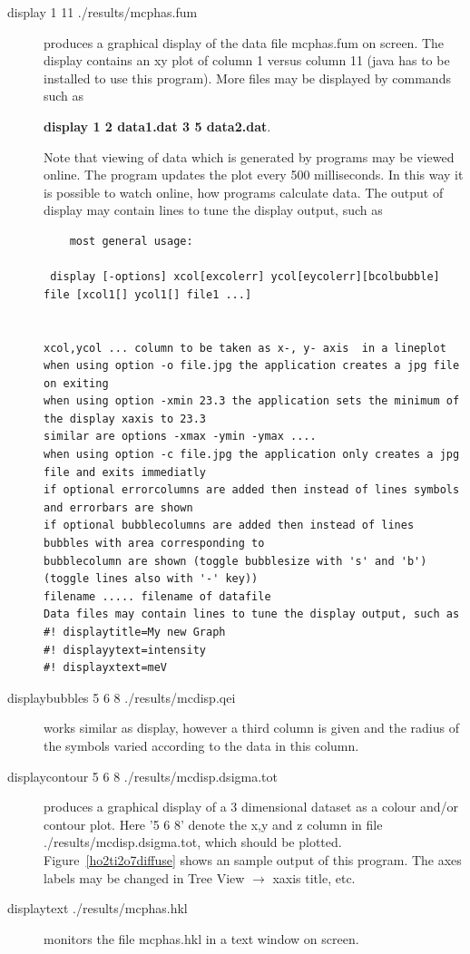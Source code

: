 \begin{description} 
\item [display 1 11 ./results/mcphas.fum] produces a graphical display of the data %
file
mcphas.fum on screen. The display contains an xy plot of column 1 versus column 11
({\prg java} has to be installed to use this program). 
More files may be displayed by commands such as

{\bf display 1 2 data1.dat 3 5 data2.dat}.

Note that viewing of 
data which is generated by programs may be viewed online. The program updates the plot
every 500 milliseconds. In this way it is possible to watch online, how programs
calculate data. The output of display may contain lines to tune the display output, %
such as
\begin{verbatim}
	most general usage: 

 display [-options] xcol[excolerr] ycol[eycolerr][bcolbubble] file [xcol1[] ycol1[] file1 ...]


xcol,ycol ... column to be taken as x-, y- axis  in a lineplot
when using option -o file.jpg the application creates a jpg file on exiting
when using option -xmin 23.3 the application sets the minimum of the display xaxis to 23.3
similar are options -xmax -ymin -ymax ....
when using option -c file.jpg the application only creates a jpg file and exits immediatly
if optional errorcolumns are added then instead of lines symbols and errorbars are shown
if optional bubblecolumns are added then instead of lines bubbles with area corresponding to
bubblecolumn are shown (toggle bubblesize with 's' and 'b')
(toggle lines also with '-' key))
filename ..... filename of datafile
Data files may contain lines to tune the display output, such as
#! displaytitle=My new Graph
#! displayytext=intensity
#! displayxtext=meV 
\end{verbatim} 

\item [displaybubbles  5 6 8 ./results/mcdisp.qei] works similar as display, however
a third column is given and the radius of the symbols varied according to the data in 
this column.

\item [displaycontour 5 6 8 ./results/mcdisp.dsigma.tot] produces a graphical
display of a 3 dimensional dataset as a colour and/or contour plot. Here '5 6 8' 
denote the x,y and z column in file {\prg ./results/mcdisp.dsigma.tot}, which should
be plotted. Figure~\ref{ho2ti2o7diffuse} shows an sample output of this program. The axes labels may be changed
in Tree View $\rightarrow$ xaxis title, etc.

\item [displaytext ./results/mcphas.hkl] monitors the file mcphas.hkl in a text window
on screen.
\end{description} 

